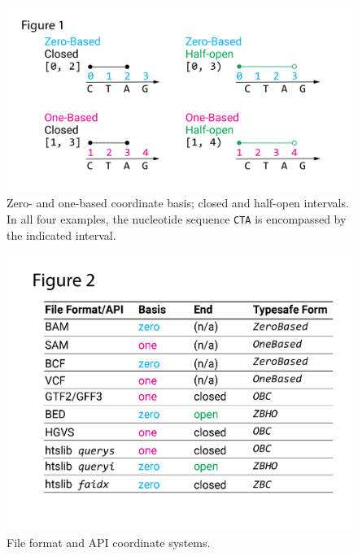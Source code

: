 \documentclass[12pt]{article}
\begin{document}
\begin{figure}[h]
\includegraphics[width=\columnwidth]{coordsystems.png}
\caption{Zero- and one-based coordinate basis; closed and half-open intervals. In all four examples, the nucleotide sequence \texttt{CTA} is encompassed by the indicated interval.}
\label{fig:coordinatesystems}
\end{figure}


\begin{figure}[h] 
\includegraphics[width=\columnwidth]{formats.png}
\caption{File format and API coordinate systems.}
\label{fig:filesandapis}
\end{figure}
\end{document}
